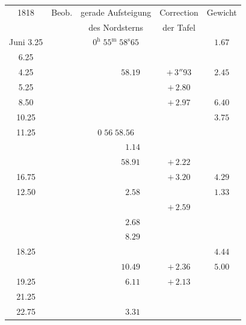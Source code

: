 \documentclass[12pt,a4paper]{article}
\begin{document}
\begin{center}
\small
\begin{tabular}{c|c|c|c|c}
\toprule
1818 & Beob. & gerade Aufsteigung & Correction & Gewicht \\
& & des Nordsterns & der Tafel & \\
\midrule
Juni \phantom{0}3.25 & & $0^{\mathrm{h}}\;55^{\mathrm{m}}\;58^{\mathrm{s}}65$ & & $1.67$ \\
\phantom{0}\phantom{0}\phantom{0} 6.25 & & & & \\
\phantom{0}\phantom{0}\phantom{0} 4.25 & & $\phantom{0}\phantom{0}\phantom{0}\phantom{0}\phantom{0}\phantom{0}\phantom{0}58.19$ & $+\,3''93$ & $2.45$ \\
\phantom{0}\phantom{0}\phantom{0} 5.25 & & & $+\,2.80$ & \\
\phantom{0}\phantom{0}\phantom{0} 8.50 & & & $+\,2.97$ & $6.40$ \\
\phantom{0}\phantom{0} 10.25 & & & & $3.75$ \\
\phantom{0}\phantom{0} 11.25 & & $0\;56\;58.56$ & & \\
& & $\phantom{0}\phantom{0}\phantom{0}\phantom{0}\phantom{0}\phantom{0}\phantom{0}\phantom{0}1.14$ & & \\
& & $\phantom{0}\phantom{0}\phantom{0}\phantom{0}\phantom{0}\phantom{0}\phantom{0}58.91$ & $+\,2.22$ & \\
\phantom{0}\phantom{0} 16.75 & & & $+\,3.20$ & $4.29$ \\
\phantom{0}\phantom{0} 12.50 & & $\phantom{0}\phantom{0}\phantom{0}\phantom{0}\phantom{0}\phantom{0}\phantom{0}\phantom{0}2.58$ & & $1.33$ \\
& & & $+\,2.59$ & \\
& & $\phantom{0}\phantom{0}\phantom{0}\phantom{0}\phantom{0}\phantom{0}\phantom{0}\phantom{0}2.68$ & & \\
& & $\phantom{0}\phantom{0}\phantom{0}\phantom{0}\phantom{0}\phantom{0}\phantom{0}\phantom{0}8.29$ & & \\
\phantom{0}\phantom{0} 18.25 & & & & $4.44$ \\
& & $\phantom{0}\phantom{0}\phantom{0}\phantom{0}\phantom{0}\phantom{0}\phantom{0}10.49$ & $+\,2.36$ & $5.00$ \\
\phantom{0}\phantom{0} 19.25 & & $\phantom{0}\phantom{0}\phantom{0}\phantom{0}\phantom{0}\phantom{0}\phantom{0}\phantom{0}6.11$ & $+\,2.13$ & \\
\phantom{0}\phantom{0} 21.25 & & & & \\
\phantom{0}\phantom{0} 22.75 & & $\phantom{0}\phantom{0}\phantom{0}\phantom{0}\phantom{0}\phantom{0}\phantom{0}\phantom{0}3.31$ & & \\

\end{tabular}
\end{center}
\end{document}
